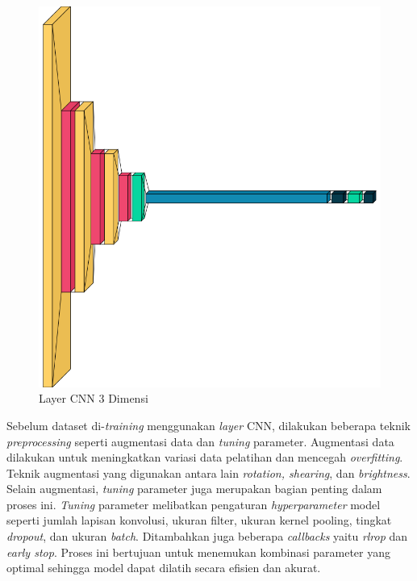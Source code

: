 \begin{figure} [ht] \centering
  \includegraphics[scale=0.2]{gambar/bab3/3dlayer.png}
  \caption{Layer CNN 3 Dimensi}
  \label{fig:3dlayer}
\end{figure}

Sebelum dataset di-\emph{training} menggunakan \emph{layer} CNN, dilakukan beberapa teknik \emph{preprocessing} seperti augmentasi data dan \emph{tuning} parameter. Augmentasi data dilakukan untuk meningkatkan variasi data pelatihan dan mencegah \emph{overfitting}. Teknik augmentasi yang digunakan antara lain \emph{rotation, shearing}, dan \emph{brightness}. Selain augmentasi, \emph{tuning} parameter juga merupakan bagian penting dalam proses ini. \emph{Tuning} parameter melibatkan pengaturan \emph{hyperparameter} model seperti jumlah lapisan konvolusi, ukuran filter, ukuran kernel pooling, tingkat \emph{dropout}, dan ukuran \emph{batch}. Ditambahkan juga beberapa \emph{callbacks} yaitu \emph{rlrop} dan \emph{early stop}. Proses ini bertujuan untuk menemukan kombinasi parameter yang optimal sehingga model dapat dilatih secara efisien dan akurat.

